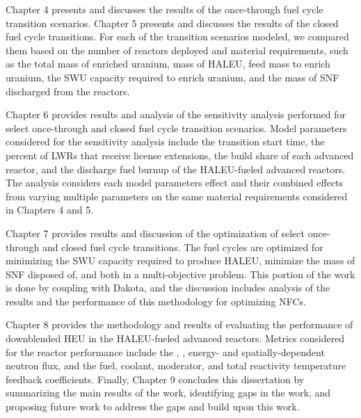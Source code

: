 Chapter 4 presents and discusses the results of the 
once-through fuel cycle transition scenarios. Chapter 5 presents 
and discusses the 
results of the closed fuel cycle transitions. For each of the transition 
scenarios modeled, we compared them based on the number of reactors 
deployed and material requirements, such as the total mass of enriched 
uranium, mass of \gls{HALEU}, 
feed mass to enrich uranium, the \gls{SWU} capacity required to enrich 
uranium, and the mass of \gls{SNF} discharged from the reactors. 

Chapter 6 provides results 
and analysis of the sensitivity analysis performed for select once-through 
and closed fuel cycle transition scenarios. Model parameters considered 
for the sensitivity analysis include the transition start time, 
the percent of \glspl{LWR} that receive license extensions, the build share 
of each advanced reactor, and the discharge fuel burnup of the 
\gls{HALEU}-fueled advanced reactors. The analysis considers each model 
parameters effect and their combined effects from varying multiple 
parameters on the same material requirements considered in Chapters 4 and 5.

Chapter 7 provides 
results and discussion of the optimization of select once-through and 
closed fuel cycle transitions. The fuel cycles are optimized for minimizing 
the \gls{SWU} capacity required to produce \gls{HALEU}, minimize the 
mass of \gls{SNF} disposed of, and both in a multi-objective problem. This 
portion of the work is done by coupling \Cyclus with Dakota, 
and the discussion includes analysis of the results 
and the performance of this methodology for optimizing \glspl{NFC}. 

Chapter 8 provides the methodology and 
results of evaluating the performance of downblended \gls{HEU} in 
the \gls{HALEU}-fueled advanced reactors. Metrics considered for the 
reactor performance include the \keff, \betaEff, energy- and 
spatially-dependent neutron flux, and the fuel, coolant, moderator, and
total reactivity temperature feedback coefficients. 
Finally, Chapter 9 concludes this dissertation by summarizing 
the main results of the work, identifying gaps in the work, and 
proposing future work to address the gaps and 
build upon this work. 